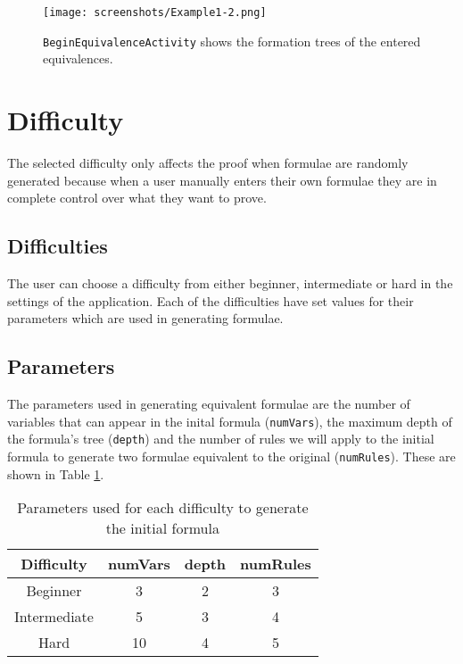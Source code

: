 \documentclass{report}
\begin{document}
\begin{figure}[ht!]
    \centering
    \texttt{[image: screenshots/Example1-2.png]}
    \caption{{\tt BeginEquivalenceActivity} shows the formation trees of the entered equivalences.}
    \label{beginequivalenceactivity}
\end{figure}
 
\section{Difficulty}
\label{sec:difficulty}

The selected difficulty only affects the proof when formulae are randomly generated because when a user manually enters their own formulae they are in complete control over what they want to prove.

\subsection{Difficulties}

The user can choose a difficulty from either beginner, intermediate or hard in the settings of the application. Each of the difficulties have set values for their parameters which are used in generating formulae. 

\subsection{Parameters}

The parameters used in generating equivalent formulae are the number of variables that can appear in the inital formula ({\tt numVars}), the maximum depth of the formula's tree ({\tt depth}) and the number of rules we will apply to the initial formula to generate two formulae equivalent to the original ({\tt numRules}). These are shown in Table \ref{table:parameters}.

\begin{table}[ht!]
\begin{center}
  \begin{tabular}{ | c | c | c | c | }
    \hline
    Difficulty & numVars & depth & numRules \\ \hline
    Beginner & 3 & 2 & 3 \\
    Intermediate & 5 & 3 & 4 \\
    Hard & 10 & 4 & 5 \\
    \hline
  \end{tabular}
\end{center}
\caption{Parameters used for each difficulty to generate the initial formula}
\label{table:parameters}
\end{table}
\end{document}
